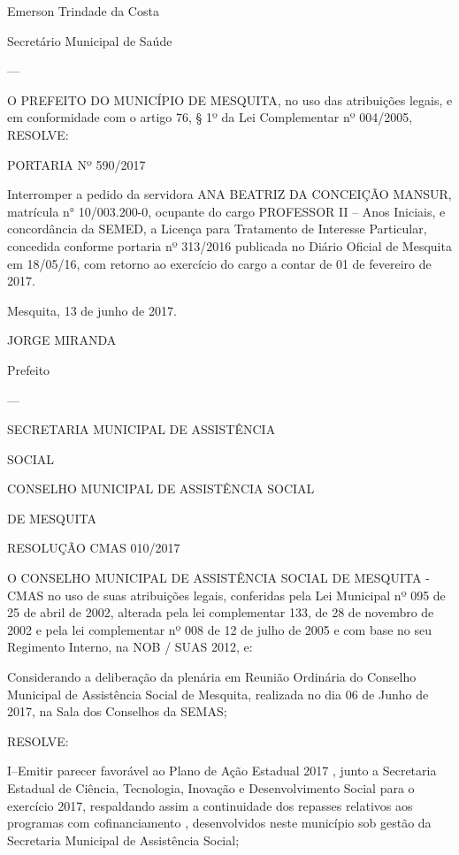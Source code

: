 \documentclass{doliberto}
\begin{document}
Emerson Trindade da Costa 

Secretário Municipal de Saúde 

---

O  PREFEITO  DO  MUNICÍPIO  DE  MESQUITA,  no  uso  das 
atribuições legais, e em conformidade com o artigo 76, § 1º 
da Lei Complementar nº 004/2005, 
  RESOLVE:  
 
PORTARIA Nº 590/2017 
 
Interromper  a  pedido  da  servidora  ANA  BEATRIZ  DA 
CONCEIÇÃO  MANSUR,  matrícula  n°  10/003.200-0, 
ocupante  do  cargo      PROFESSOR  II  –  Anos  Iniciais,  e 
concordância da SEMED, a Licença para Tratamento de 
Interesse  Particular,  concedida  conforme  portaria  nº 
313/2016  publicada  no  Diário  Oficial  de  Mesquita  em 
18/05/16, com retorno ao exercício do cargo a contar de  01 
de fevereiro de 2017. 
 

Mesquita, 13 de junho de 2017. 

 

JORGE MIRANDA 

Prefeito 

---

SECRETARIA MUNICIPAL DE ASSISTÊNCIA 

SOCIAL 

CONSELHO MUNICIPAL DE ASSISTÊNCIA SOCIAL 

DE MESQUITA 

RESOLUÇÃO CMAS 010/2017  

 
O  CONSELHO  MUNICIPAL  DE  ASSISTÊNCIA  SOCIAL  DE 
MESQUITA  -  CMAS  no  uso  de  suas  atribuições  legais, 
conferidas pela Lei Municipal nº 095 de 25 de abril de 2002, 
alterada pela lei complementar 133, de 28 de novembro de 
2002 e pela lei complementar nº 008 de 12 de julho de 2005 
e com base no seu Regimento Interno, na NOB / SUAS 2012, 
e:  
 
Considerando  a  deliberação  da  plenária  em  Reunião 
Ordinária  do  Conselho  Municipal  de  Assistência  Social  de 
Mesquita, realizada no dia 06 de Junho de 2017, na Sala dos 
Conselhos da SEMAS; 
 
RESOLVE: 
 
I–Emitir parecer favorável ao Plano de Ação Estadual 2017 , 
junto a Secretaria Estadual de Ciência, Tecnologia, Inovação 
e  Desenvolvimento  Social  para  o  exercício  2017, 
respaldando assim a continuidade dos repasses relativos aos 
programas  com  cofinanciamento 
,  desenvolvidos  neste 
município sob  gestão da Secretaria Municipal de Assistência 
Social;  
 
\end{document}

